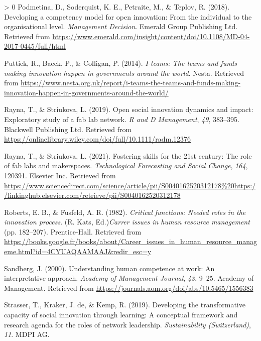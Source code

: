 \documentclass[]{elsarticle} %
\newlength{\cslhangindent}
\newenvironment{CSLReferences}[3] %
 {%
  \setlength{\parindent}{0pt}
  \ifodd #1 \everypar{\setlength{\hangindent}{\cslhangindent}}\ignorespaces\fi
  \ifnum #2 > 0
  \setlength{\parskip}{#2\baselineskip}
  \fi
 }%
 {}
\begin{document}
\begin{CSLReferences}{1}{0}
\leavevmode\hypertarget{ref-Podmetina2018}{}%
Podmetina, D., Soderquist, K. E., Petraite, M., \& Teplov, R. (2018).
Developing a competency model for open innovation: From the individual
to the organisational level. \emph{Management Decision}. Emerald Group
Publishing Ltd. Retrieved from
\url{https://www.emerald.com/insight/content/doi/10.1108/MD-04-2017-0445/full/html}

\leavevmode\hypertarget{ref-Puttick2014}{}%
Puttick, R., Baeck, P., \& Colligan, P. (2014). \emph{I-teams: The teams
and funds making innovation happen in governments around the world}.
Nesta. Retrieved from
\url{https://www.nesta.org.uk/report/i-teams-the-teams-and-funds-making-innovation-happen-in-governments-around-the-world/}

\leavevmode\hypertarget{ref-Rayna2019}{}%
Rayna, T., \& Striukova, L. (2019). Open social innovation dynamics and
impact: Exploratory study of a fab lab network. \emph{R and D
Management}, \emph{49}, 383--395. Blackwell Publishing Ltd. Retrieved
from \url{https://onlinelibrary.wiley.com/doi/full/10.1111/radm.12376}

\leavevmode\hypertarget{ref-Rayna2021}{}%
Rayna, T., \& Striukova, L. (2021). Fostering skills for the 21st
century: The role of fab labs and makerspaces. \emph{Technological
Forecasting and Social Change}, \emph{164}, 120391. Elsevier Inc.
Retrieved from
\url{https://www.sciencedirect.com/science/article/pii/S0040162520312178\%20https://linkinghub.elsevier.com/retrieve/pii/S0040162520312178}

\leavevmode\hypertarget{ref-Roberts1982}{}%
Roberts, E. B., \& Fusfeld, A. R. (1982). \emph{Critical functions:
Needed roles in the innovation process}. (R. Kats, Ed.)\emph{Carrer
issues in human resource management} (pp. 182--207). Prentice-Hall.
Retrieved from
\url{https://books.google.fr/books/about/Career_issues_in_human_resource_manageme.html?id=4CYUAQAAMAAJ\&redir_esc=y}

\leavevmode\hypertarget{ref-Sandberg2000}{}%
Sandberg, J. (2000). Understanding human competence at work: An
interpretative approach. \emph{Academy of Management Journal},
\emph{43}, 9--25. Academy of Management. Retrieved from
\url{https://journals.aom.org/doi/abs/10.5465/1556383}

\leavevmode\hypertarget{ref-Strasser2019}{}%
Strasser, T., Kraker, J. de, \& Kemp, R. (2019). Developing the
transformative capacity of social innovation through learning: A
conceptual framework and research agenda for the roles of network
leadership. \emph{Sustainability (Switzerland)}, \emph{11}. MDPI AG.


\end{CSLReferences}
\end{document}
